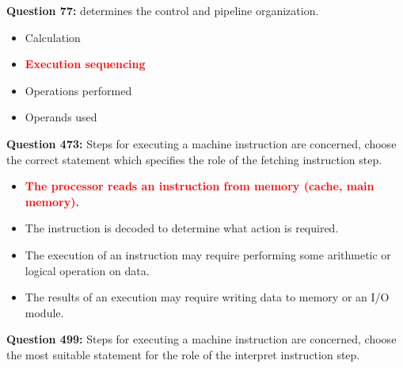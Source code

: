 \documentclass[12pt,a4paper]{article}
\begin{document}
\vspace{0.5cm}

\vspace{0.5cm}

\textbf{Question 77:} \underline{\hspace{1.5cm}} determines the control and pipeline organization.

\begin{itemize}
    \item[\textbf{A.}] Calculation
    \item[\textbf{B.}] \textcolor{red}{\textbf{Execution sequencing}}
    \item[\textbf{C.}] Operations performed
    \item[\textbf{D.}] Operands used
\end{itemize}

\vspace{0.5cm}

\vspace{0.5cm}

\vspace{0.5cm}

\vspace{0.5cm}

\textbf{Question 473:} Steps for executing a machine instruction are concerned, choose the correct statement which specifies the role of the fetching instruction step.

\begin{itemize}
    \item[\textbf{A.}] \textcolor{red}{\textbf{The processor reads an instruction from memory (cache, main memory).}}
    \item[\textbf{B.}] The instruction is decoded to determine what action is required.
    \item[\textbf{C.}] The execution of an instruction may require performing some arithmetic or logical operation on data.
    \item[\textbf{D.}] The results of an execution may require writing data to memory or an I/O module.
\end{itemize}

\vspace{0.5cm}

\vspace{0.5cm}

\textbf{Question 499:} Steps for executing a machine instruction are concerned, choose the most suitable statement for the role of the interpret instruction step.
\end{document}
